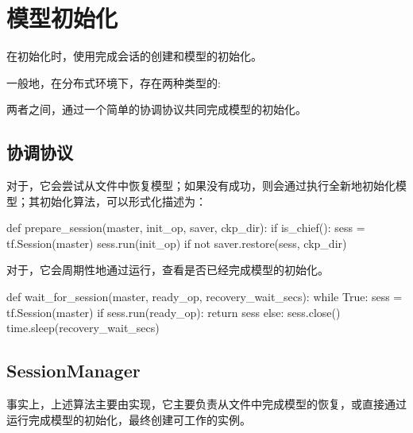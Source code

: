 \section{模型初始化}

\begin{content}

在初始化时，使用完成会话的创建和模型的初始化。

一般地，在分布式环境下，存在两种类型的:

\begin{enum}
\end{enum}

两者之间，通过一个简单的协调协议共同完成模型的初始化。

\subsection{协调协议}

对于，它会尝试从文件中恢复模型；如果没有成功，则会通过执行全新地初始化模型；其初始化算法，可以形式化描述为：

\begin{leftbar}
\begin{python}
def prepare_session(master, init_op, saver, ckp_dir):
  if is_chief():
    sess = tf.Session(master)
    sess.run(init_op) if not saver.restore(sess, ckp_dir)
\end{python}
\end{leftbar}

对于，它会周期性地通过运行，查看是否已经完成模型的初始化。

\begin{leftbar}
\begin{python}
def wait_for_session(master, ready_op, recovery_wait_secs):
  while True:
    sess = tf.Session(master)
    if sess.run(ready_op):
      return sess
    else:
      sess.close()
      time.sleep(recovery_wait_secs)   
\end{python}
\end{leftbar}

\subsection{SessionManager}

事实上，上述算法主要由实现，它主要负责从文件中完成模型的恢复，或直接通过运行完成模型的初始化，最终创建可工作的实例。


\end{content}
